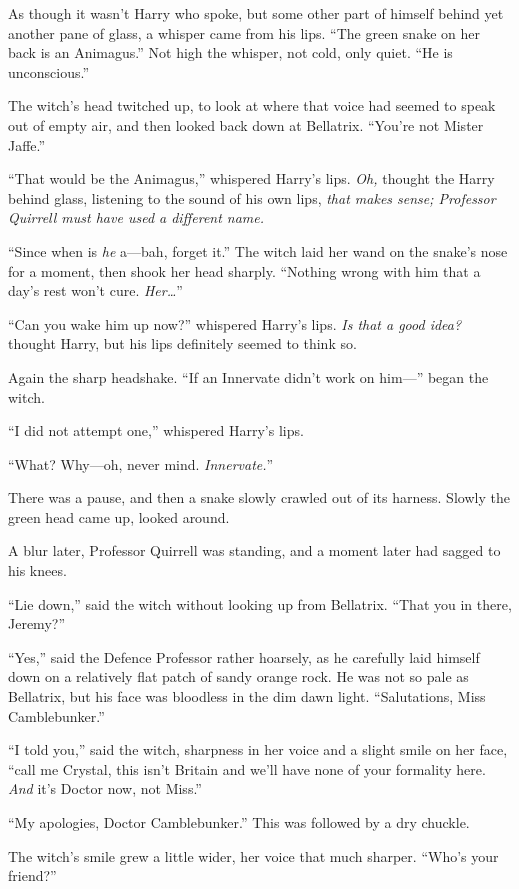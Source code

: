 As though it wasn't Harry who spoke, but some other part of himself
behind yet another pane of glass, a whisper came from his lips. ``The
green snake on her back is an Animagus.'' Not high the whisper, not
cold, only quiet. ``He is unconscious.''

The witch's head twitched up, to look at where that voice had seemed to
speak out of empty air, and then looked back down at Bellatrix. ``You're
not Mister Jaffe.''

``That would be the Animagus,'' whispered Harry's lips. \emph{Oh,}
thought the Harry behind glass, listening to the sound of his own lips,
\emph{that makes sense; Professor Quirrell must have used a different
name.}

``Since when is \emph{he} a---bah, forget it.'' The witch laid her wand
on the snake's nose for a moment, then shook her head sharply. ``Nothing
wrong with him that a day's rest won't cure. \emph{Her\ldots{}}''

``Can you wake him up now?'' whispered Harry's lips. \emph{Is that a
good idea?} thought Harry, but his lips definitely seemed to think so.

Again the sharp headshake. ``If an Innervate didn't work on him---''
began the witch.

``I did not attempt one,'' whispered Harry's lips.

``What? Why---oh, never mind. \emph{Innervate.}''

There was a pause, and then a snake slowly crawled out of its harness.
Slowly the green head came up, looked around.

A blur later, Professor Quirrell was standing, and a moment later had
sagged to his knees.

``Lie down,'' said the witch without looking up from Bellatrix. ``That
you in there, Jeremy?''

``Yes,'' said the Defence Professor rather hoarsely, as he carefully
laid himself down on a relatively flat patch of sandy orange rock. He
was not so pale as Bellatrix, but his face was bloodless in the dim dawn
light. ``Salutations, Miss Camblebunker.''

``I told you,'' said the witch, sharpness in her voice and a slight
smile on her face, ``call me Crystal, this isn't Britain and we'll have
none of your formality here. \emph{And} it's Doctor now, not Miss.''

``My apologies, Doctor Camblebunker.'' This was followed by a dry
chuckle.

The witch's smile grew a little wider, her voice that much sharper.
``Who's your friend?''

